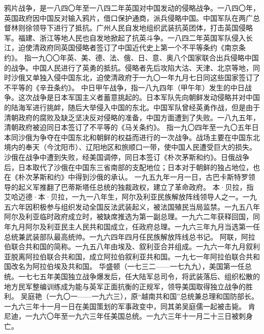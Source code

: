 \begin{maonote}
鸦片战争，是一八四〇年至一八四二年英国对中国发动的侵略战争。一八四〇年，英国政府因中国反对输入鸦片，借口保护通商，派兵侵略中国。中国军队在两广总督林则徐领导下进行了抵抗。广州人民自发地组织武装抗英团体，打击英国侵略军。福建、浙江等地人民也自发地掀起了抗英斗争。一八四二年英国军队侵入长江，迫使清政府同英国侵略者签订了中国近代史上第一个不平等条约《南京条约》。
指一九〇〇年英、美、德、法、俄、日、意、奥八个国家联合出兵侵略中国的战争。中国人民进行了英勇的抵抗。侵略者先后攻陷大沽、天津、北京等地，同时沙俄又单独入侵中国东北，迫使清政府于一九〇一年九月七日同这些国家签订了不平等的《辛丑条约》。
中日甲午战争，指一八九四年（甲午年）发生的中日战争。这次战争是日本军国主义者蓄意挑起的。日本军队先向朝鲜发动侵略并对中国的陆海军进行挑衅，随后大举侵入中国的东北。中国军队曾经英勇作战，但是由于清朝政府的腐败及缺乏坚决反对侵略的准备，中国方面遭到了失败。一八九五年，清朝政府被迫同日本签订了不平等的《马关条约》。
指一九〇四年至一九〇五年日本同沙俄为争夺在中国东北和朝鲜的权益而进行的一次战争。战场主要在中国东北境内的奉天（今沈阳市）、辽阳地区和旅顺口一带，使中国人民遭受巨大的损失。沙俄在战争中遭到失败，经美国调停，同日本签订《朴次茅斯和约》。日俄战争后，日本取代了沙俄在中国东三省南部的支配地位；日本对于朝鲜的独占地位，也在《朴次茅斯和约》中得到沙俄的承认。
一九五九年一月一日，古巴卡斯特罗领导的起义军推翻了巴蒂斯塔任总统的独裁政权，建立了革命政府。
本·贝拉，指艾哈迈德·本·贝拉，一九一八年生，阿尔及利亚民族解放阵线领导人之一。一九五六年因积极参与组织发动全国反法武装起义，被法国殖民当局监禁。一九五八年阿尔及利亚临时政府成立时，被缺席推选为第一副总理。一九六二年获释回国，同年九月阿尔及利亚民主人民共和国成立，任政府总理。一九六三年九月当选第一任总统兼武装部队最高统帅。一九六四年四月任民族解放阵线总书记。
阿联，阿拉伯联合共和国的简称。一九五八年由埃及、叙利亚合并组成。一九六一年九月叙利亚脱离阿拉伯联合共和国，成立阿拉伯叙利亚共和国。一九七一年阿拉伯联合共和国改名为阿拉伯埃及共和国。
华盛顿（一七三二——一七九九），美国第一任总统。一七七五年美国独立战争爆发后，任大陆军总司令，将武装落后、组织松散的地方民军整编训练成为能与英军正面抗衡的正规军，领导美国取得独立战争的胜利。
吴庭艳（一九〇一——一九六三），原“越南共和国”总统兼总理和国防部长。一九六三年十一月一日在美国策划的军事政变中，同其弟吴庭儒一起被击毙。
肯尼迪，一九六〇年至一九六三年任美国总统。一九六三年十一月二十三日被刺身亡。
\end{maonote}
